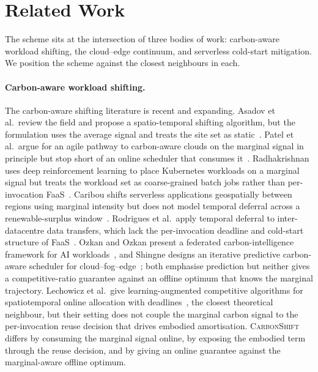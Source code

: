 \section{Related Work}
\label{sec:related}

The scheme sits at the intersection of three bodies of work: carbon-aware workload shifting, the cloud--edge continuum, and serverless cold-start mitigation. We position the scheme against the closest neighbours in each.

\paragraph{Carbon-aware workload shifting.}
The carbon-aware shifting literature is recent and expanding. Asadov et al.\ review the field and propose a spatio-temporal shifting algorithm, but the formulation uses the average signal and treats the site set as static~\cite{asadov2025carbonaware}. Patel et al.\ argue for an agile pathway to carbon-aware clouds on the marginal signal in principle but stop short of an online scheduler that consumes it~\cite{patel2024agile}. Radhakrishnan uses deep reinforcement learning to place Kubernetes workloads on a marginal signal but treats the workload set as coarse-grained batch jobs rather than per-invocation FaaS~\cite{radhakrishnan2024carbonaware}. Caribou shifts serverless applications geospatially between regions using marginal intensity but does not model temporal deferral across a renewable-surplus window~\cite{gsteiger2024caribou}. Rodrigues et al.\ apply temporal deferral to inter-datacentre data transfers, which lack the per-invocation deadline and cold-start structure of FaaS~\cite{rodrigues2025carbonaware}. Ozkan and Ozkan present a federated carbon-intelligence framework for AI workloads~\cite{ozkan2025federated}, and Shingne designs an iterative predictive carbon-aware scheduler for cloud--fog--edge~\cite{shingne2025design}; both emphasise prediction but neither gives a competitive-ratio guarantee against an offline optimum that knows the marginal trajectory. Lechowicz et al.\ give learning-augmented competitive algorithms for spatiotemporal online allocation with deadlines~\cite{lechowicz2024learningaugmented}, the closest theoretical neighbour, but their setting does not couple the marginal carbon signal to the per-invocation reuse decision that drives embodied amortisation. \textsc{CarbonShift} differs by consuming the marginal signal online, by exposing the embodied term through the reuse decision, and by giving an online guarantee against the marginal-aware offline optimum.

